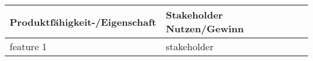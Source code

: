 \documentclass[../../Pflichtenheft.tex]{subfiles}
\begin{document}
    \begin{longtable}{|p{7cm}|p{7cm}|}
        \hline
        Produktfähigkeit-/Eigenschaft & Stakeholder Nutzen/Gewinn \\ \hline
        feature 1 & stakeholder

        \hline
    \end{longtable}
\end{document}
